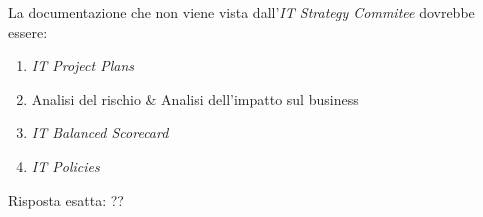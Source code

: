 \begin{Exercise} [
  title={Quiz},
  label={esPG3}
  ]

  \Question La documentazione che non viene vista dall'\textit{IT Strategy 
Commitee} dovrebbe essere:
\begin{enumerate}
 \item \textit{IT Project Plans}
 \item Analisi del rischio \& Analisi dell'impatto sul business
 \item \textit{IT Balanced Scorecard}
 \item \textit{IT Policies}
\end{enumerate}

\end{Exercise}

\begin{Answer} [
  ref={esPG3},
  number={3}
  ]

  \Question Risposta esatta: ??
\end{Answer}
